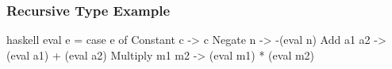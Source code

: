 \documentclass[dvipsnames]{beamer}
\theoremstyle{plain}
\begin{document}
\begin{frame}[fragile]
  \frametitle{Recursive Type Example}

  \begin{example}
    \pause
    \begin{pygments}{haskell}
eval e =
    case e of
      Constant c -> c
      Negate n -> -(eval n)
      Add a1 a2 -> (eval a1) + (eval a2)
      Multiply m1 m2 -> (eval m1) * (eval m2)
    \end{pygments}
  \end{example}
\end{frame}
% 
% 
% 
\end{document}
